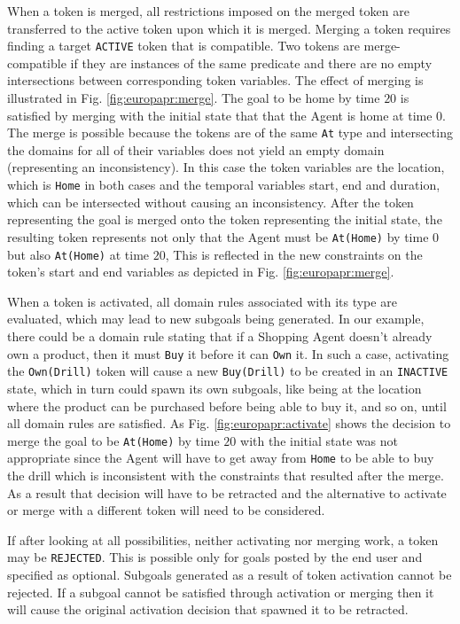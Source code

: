 \begin{description}
\begin{enumerate}
\end{enumerate}

When a token is merged, all restrictions imposed on the merged token
are transferred to the active token upon which it is merged. Merging a
token requires finding a target \texttt{ACTIVE} token that is
compatible. Two tokens are merge-compatible if they are instances of
the same predicate and there are no empty intersections between
corresponding token variables.  The effect of merging is illustrated
in Fig. \ref{fig:europapr:merge}. The goal to be home by time $20$ is
satisfied by merging with the initial state that 
that the Agent is home at time $0$.  The merge is possible because the
tokens are of the same \texttt{At} type and intersecting the domains
for all of their variables does not yield an empty domain (representing
an inconsistency). In this case the token variables are the location,
which is \texttt{Home} in both cases and the temporal variables start,
end and duration, which can be intersected without causing an
inconsistency. After the token representing the goal is merged onto
the token representing the initial state, the resulting token
represents not only that the Agent must be \texttt{At(Home)} by time
$0$ but also \texttt{At(Home)} at time $20$, This is reflected in the
new constraints on the token's start and end variables as depicted in
Fig. \ref{fig:europapr:merge}.

When a token is activated, all domain rules associated with its type
are evaluated, which may lead to new subgoals being generated. In our
example, there could be a domain rule stating that if a Shopping Agent
doesn't already own a product, then it must \texttt{Buy} it before it
can \texttt{Own} it. In such a case, activating the
\texttt{Own(Drill)} token will cause a new \texttt{Buy(Drill)} to be
created in an \texttt{INACTIVE} state, which in turn could spawn its
own subgoals, like being at the location where the product can be
purchased before being able to buy it, and so on, until all domain
rules are satisfied. As Fig. \ref{fig:europapr:activate} shows the
decision to merge the goal to be \texttt{At(Home)} by time $20$ with
the initial state was not appropriate since the Agent will have to get
away from \texttt{Home} to be able to buy the drill which is
inconsistent with the constraints that resulted after the merge. As a
result that decision will have to be retracted and the alternative to
activate or merge with a different token will need to be considered.

If after looking at all possibilities, neither activating nor merging
work, a token may be \texttt{REJECTED}. This is possible only for
goals posted by the end user and specified as optional. Subgoals
generated as a result of token activation cannot be rejected. If a
subgoal cannot be satisfied through activation or merging then it will
cause the original activation decision that spawned it to be
retracted.


\end{description}
